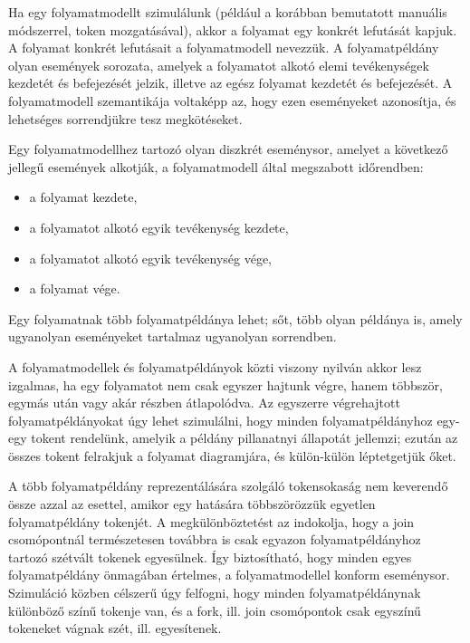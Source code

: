 
Ha egy folyamatmodellt szimulálunk (például a korábban bemutatott manuális módszerrel, token mozgatásával), akkor a folyamat egy konkrét lefutását kapjuk. A folyamat konkrét lefutásait a folyamatmodell  nevezzük. A folyamatpéldány olyan események sorozata, amelyek a folyamatot alkotó elemi tevékenységek kezdetét és befejezését jelzik, illetve az egész folyamat kezdetét és befejezését. A folyamatmodell szemantikája voltaképp az, hogy ezen eseményeket azonosítja, és lehetséges sorrendjükre tesz megkötéseket.

\begin{definicio}
	Egy folyamatmodellhez tartozó  olyan diszkrét eseménysor, amelyet a következő jellegű események alkotják, a folyamatmodell által megszabott időrendben:
	\begin{itemize}
	  \item a folyamat kezdete,
	  \item a folyamatot alkotó egyik tevékenység kezdete, 
	  \item a folyamatot alkotó egyik tevékenység vége, 
	  \item a folyamat vége.
	\end{itemize}
\end{definicio}

\begin{megjegyzes}
Egy folyamatnak több folyamatpéldánya lehet; sőt, több olyan példánya is, amely ugyanolyan eseményeket tartalmaz ugyanolyan sorrendben.
\end{megjegyzes}

A folyamatmodellek és folyamatpéldányok közti viszony nyilván akkor lesz izgalmas, ha egy folyamatot nem csak egyszer hajtunk végre, hanem többször, egymás után vagy akár részben átlapolódva. Az egyszerre végrehajtott folyamatpéldányokat úgy lehet szimulálni, hogy minden folyamatpéldányhoz egy-egy tokent rendelünk, amelyik a példány pillanatnyi állapotát jellemzi; ezután az összes tokent felrakjuk a folyamat diagramjára, és külön-külön léptetgetjük őket. 

\begin{megjegyzes}
A több folyamatpéldány reprezentálására szolgáló tokensokaság nem keverendő össze azzal az esettel, amikor egy  hatására többszörözzük egyetlen folyamatpéldány tokenjét.  A megkülönböztetést az indokolja, hogy a join csomópontnál természetesen továbbra is csak egyazon folyamatpéldányhoz tartozó szétvált tokenek egyesülnek. Így biztosítható, hogy minden egyes folyamatpéldány önmagában értelmes, a folyamatmodellel konform eseménysor. Szimuláció közben célszerű úgy felfogni, hogy minden folyamatpéldánynak különböző színű tokenje van, és a fork, ill. join csomópontok csak egyszínű tokeneket vágnak szét, ill. egyesítenek. 
\end{megjegyzes}

